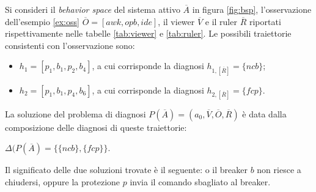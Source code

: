 \begin{ex} \label{ex:problem}
Si consideri il \emph{behavior space} del sistema attivo $\overline{A}$ in figura \ref{fig:bsp}, l'osservazione dell'esempio \ref{ex:oss} $\overline{O} = [awk, opb, ide]$, il viewer $\overline{V}$ e il ruler $\overline{R}$ riportati rispettivamente nelle tabelle \ref{tab:viewer} e \ref{tab:ruler}.
Le possibili traiettorie consistenti con l'osservazione sono:
\begin{itemize}
\item $h_1 = [p_1,b_1,p_2,b_4]$, a cui corrisponde la diagnosi $h_{1,[\overline{R}]} = \{ncb\}$;
\item $h_2 = [p_1,b_1,p_4,b_6]$, a cui corrisponde la diagnosi $h_{2,[\overline{R}]} = \{fcp\}$.
\end{itemize}
La soluzione del problema di diagnosi $P(\overline{A}) = (a_0,\overline{V},\overline{O},\overline{R})$ è data dalla composizione delle diagnosi di queste traiettorie:
\begin{center}
$\Delta(P(\overline{A}) = \{\{ncb\},\{fcp\}\}$.
\end{center}
Il significato delle due soluzioni trovate è il seguente: o il breaker $b$ non riesce a chiudersi, oppure la protezione $p$ invia il comando sbagliato al breaker.  
\end{ex}


\newpage
